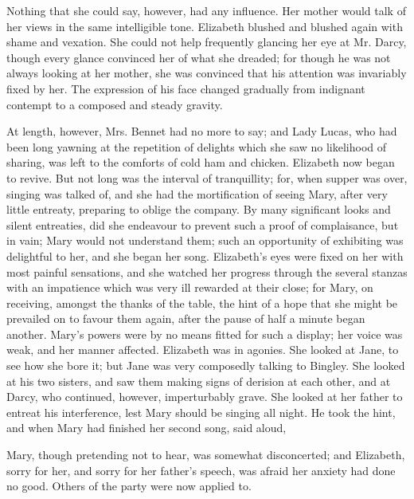 
Nothing that she could say, however, had any influence. Her mother would talk of her views in the same intelligible tone. Elizabeth blushed and blushed again with shame and vexation. She could not help frequently glancing her eye at Mr. Darcy, though every glance convinced her of what she dreaded; for though he was not always looking at her mother, she was convinced that his attention was invariably fixed by her. The expression of his face changed gradually from indignant contempt to a composed and steady gravity.

At length, however, Mrs. Bennet had no more to say; and Lady Lucas, who had been long yawning at the repetition of delights which she saw no likelihood of sharing, was left to the comforts of cold ham and chicken. Elizabeth now began to revive. But not long was the interval of tranquillity; for, when supper was over, singing was talked of, and she had the mortification of seeing Mary, after very little entreaty, preparing to oblige the company. By many significant looks and silent entreaties, did she endeavour to prevent such a proof of complaisance, but in vain; Mary would not understand them; such an opportunity of exhibiting was delightful to her, and she began her song. Elizabeth's eyes were fixed on her with most painful sensations, and she watched her progress through the several stanzas with an impatience which was very ill rewarded at their close; for Mary, on receiving, amongst the thanks of the table, the hint of a hope that she might be prevailed on to favour them again, after the pause of half a minute began another. Mary's powers were by no means fitted for such a display; her voice was weak, and her manner affected. Elizabeth was in agonies. She looked at Jane, to see how she bore it; but Jane was very composedly talking to Bingley. She looked at his two sisters, and saw them making signs of derision at each other, and at Darcy, who continued, however, imperturbably grave. She looked at her father to entreat his interference, lest Mary should be singing all night. He took the hint, and when Mary had finished her second song, said aloud, 

Mary, though pretending not to hear, was somewhat disconcerted; and Elizabeth, sorry for her, and sorry for her father's speech, was afraid her anxiety had done no good. Others of the party were now applied to.

